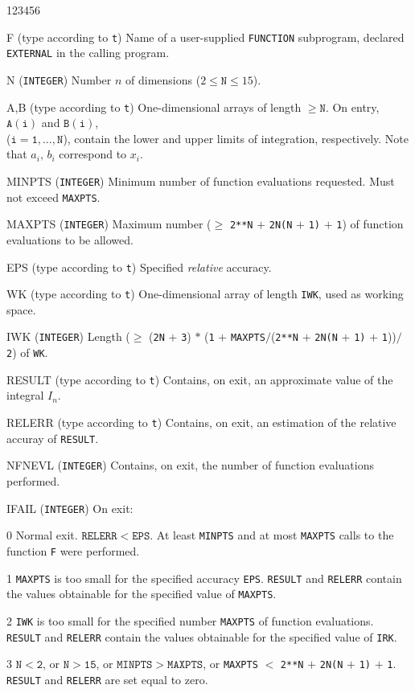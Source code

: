 \begin{DLtt}{123456}
\item[F] (type according to {\tt t}) Name of a user-supplied
{\tt FUNCTION} subprogram, declared {\tt EXTERNAL} in the calling
program.
\item[N] ({\tt INTEGER}) Number $n$ of dimensions
($2 \le \mathtt{N} \le 15$).
\item[A,B] (type according to {\tt t}) One-dimensional arrays of length
$\mathtt{\ge N}$. On entry, $\mathtt{A(i)}$ and $\mathtt{B(i)}$, \\
($\mathtt{i=1,\ldots,N}$), contain the lower and upper limits of
integration, respectively. Note that $a_i,\,b_i$ correspond to $x_i$.
\item[MINPTS] ({\tt INTEGER}) Minimum number of function
evaluations requested. Must not exceed {\tt MAXPTS}.
\item[MAXPTS] ({\tt INTEGER}) Maximum number
($\ge$ {\tt 2**N} $+$ {\tt 2N(N} $+$ {\tt 1)} $+$ {\tt 1})
of function evaluations to be allowed.
\item[EPS] (type according to {\tt t}) Specified {\it relative} accuracy.
\item[WK] (type according to {\tt t}) One-dimensional array of length
{\tt IWK}, used as working space.
\item[IWK] ({\tt INTEGER}) Length ($\ge$ ({\tt 2N} $+$ {\tt 3}) $*$
({\tt 1} $+$ {\tt MAXPTS}$/$({\tt 2**N} $+$ {\tt 2N(N} $+$ {\tt 1)}
$+$ {\tt 1}))$/${\tt 2}) of {\tt WK}.
\item[RESULT] (type according to {\tt t}) Contains, on exit, an
approximate value of the integral $I_n$.
\item[RELERR] (type according to {\tt t}) Contains, on exit, an
estimation of the relative accuray of {\tt RESULT}.
\item[NFNEVL] ({\tt INTEGER}) Contains, on exit, the number
of function evaluations performed.
\newpage
\item[IFAIL] ({\tt INTEGER}) On exit:
\begin{DLtt}{12}
\item[0] Normal exit. $\mathtt{RELERR < EPS}$. At least {\tt MINPTS}
and at most {\tt MAXPTS} calls to the function {\tt F} were performed.
\item[1] {\tt MAXPTS} is too small for the specified accuracy {\tt EPS}.
{\tt RESULT} and {\tt RELERR} contain the values obtainable
for the specified value of {\tt MAXPTS}.
\item[2] {\tt IWK} is too small for the specified number {\tt MAXPTS}
of function evaluations. \\
{\tt RESULT} and {\tt RELERR} contain
the values obtainable for the specified value of {\tt IRK}.
\item[3] $\mathtt{N<2}$, or $\mathtt{N>15}$, or
$\mathtt{MINPTS>MAXPTS}$, or {\tt MAXPTS} $<$
{\tt 2**N} $+$ {\tt 2N(N} $+$ {\tt 1)} $+$ {\tt 1}. \\
{\tt RESULT} and {\tt RELERR} are set equal to zero.
\end{DLtt}
\end{DLtt}
